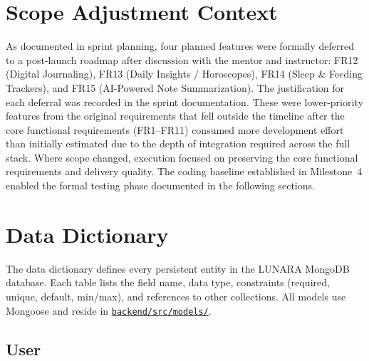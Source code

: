 \documentclass[12pt,letterpaper]{article}
\newcommand{\ghrepo}{https://github.com/omniV1/lunaraCare}
\begin{document}
\newpage

\section{Scope Adjustment Context}

As documented in sprint planning, four planned features were formally deferred to a post-launch roadmap after discussion with the mentor and instructor: FR12 (Digital Journaling), FR13 (Daily Insights / Horoscopes), FR14 (Sleep \& Feeding Trackers), and FR15 (AI-Powered Note Summarization). The justification for each deferral was recorded in the sprint documentation. These were lower-priority features from the original requirements that fell outside the timeline after the core functional requirements (FR1--FR11) consumed more development effort than initially estimated due to the depth of integration required across the full stack. Where scope changed, execution focused on preserving the core functional requirements and delivery quality. The coding baseline established in Milestone~4 enabled the formal testing phase documented in the following sections.

\section{Data Dictionary}

The data dictionary defines every persistent entity in the LUNARA MongoDB database. Each table lists the field name, data type, constraints (required, unique, default, min/max), and references to other collections. All models use Mongoose and reside in \href{\ghrepo/tree/main/backend/src/models}{\texttt{backend/src/models/}}.

\subsection{User}
\end{document}
